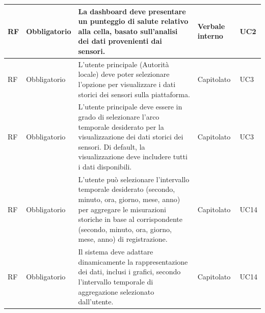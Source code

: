 \documentclass{article}
\begin{document}
\begin{longtable}{|C{1cm}|C{2cm}|>{\raggedright}m{5cm}|C{1.5cm}|C{2cm}|}
    \hline
     RF & Obbligatorio        & La dashboard deve presentare un punteggio di salute relativo alla cella, basato sull'analisi dei dati provenienti dai sensori.                                                                                                     & Verbale interno      & UC2               \\
    \hline
     RF & Obbligatorio        & L'utente principale (Autorità locale) deve poter selezionare l'opzione per visualizzare i dati storici dei sensori sulla piattaforma.                                                                                              & Capitolato      & UC3               \\
    \hline
     RF & Obbligatorio        & L'utente principale deve essere in grado di selezionare l'arco temporale desiderato per la visualizzazione dei dati storici dei sensori. Di default, la visualizzazione deve includere tutti i dati disponibili.                   & Capitolato      & UC3               \\
    \hline
     RF & Obbligatorio        & L'utente può selezionare l'intervallo temporale desiderato (secondo, minuto, ora, giorno, mese, anno) per aggregare le misurazioni storiche in base al corrispondente (secondo, minuto, ora, giorno, mese, anno) di registrazione. & Capitolato      & UC14               \\
    \hline
     RF & Obbligatorio        &     Il sistema deve adattare dinamicamente la rappresentazione dei dati, inclusi i grafici, secondo l'intervallo temporale di aggregazione selezionato dall'utente. & Capitolato      & UC14               \\
    \hline


\end{longtable}
\end{document}
